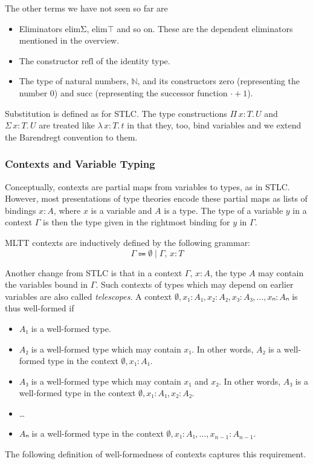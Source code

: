 \documentclass{scrartcl}
\theoremstyle{definition}
\newcommand{\Lam}[2]{λ\,#1.\, #2}
\newcommand{\PiT}[2]{Π\,#1.\, #2}
\newcommand{\SigT}[2]{Σ\,#1.\, #2}
\newcommand{\zero}{\mathrm{zero}}
\newcommand{\suc}{\mathrm{succ}}
\newcommand{\elimSig}{\mathrm{elimΣ}}
\newcommand{\elimTop}{\mathrm{elim⊤}}
\newcommand{\refl}{\mathrm{refl}}
\begin{document}
The other terms we have not seen so far are
\begin{itemize}
  \item Eliminators $\elimSig$, $\elimTop$ and so on.
        These are the dependent eliminators mentioned in the overview.
  \item The constructor $\refl$ of the identity type.
  \item The type of natural numbers, $ℕ$, and its constructors $\zero$ (representing the number 0) and $\suc$ (representing the successor function $· + 1$).
\end{itemize}

Substitution is defined as for STLC.\@
The type constructions $\PiT{x : T}{U}$ and $\SigT{x : T}{U}$ are treated like $\Lam{x : T}{t}$ in that they, too, bind variables and we extend the Barendregt convention to them.

\subsubsection{Contexts and Variable Typing}

Conceptually, contexts are partial maps from variables to types, as in STLC.\@
However, most presentations of type theories encode these partial maps as lists of bindings $x : A$, where $x$ is a variable and $A$ is a type.
The type of a variable $y$ in a context $Γ$ is then the type given in the rightmost binding for $y$ in $Γ$.

\begin{definition}[Contexts]
  MLTT contexts are inductively defined by the following grammar:
  \[
    Γ \Coloneqq ∅ \mid Γ,\, x : T
  \]
\end{definition}

Another change from STLC is that in a context $Γ,\, x : A$, the type $A$ may contain the variables bound in $Γ$.
Such contexts of types which may depend on earlier variables are also called \emph{telescopes}.
A context $∅, x₁ : A₁, x₂ : A₂, x₃ : A₃, \dots, xₙ : Aₙ$ is thus well-formed if
\begin{itemize}
  \item $A₁$ is a well-formed type.
  \item $A₂$ is a well-formed type which may contain $x₁$.
        In other words, $A₂$ is a well-formed type in the context $∅, x₁ : A₁$.
  \item $A₃$ is a well-formed type which may contain $x₁$ and $x₂$.
        In other words, $A₃$ is a well-formed type in the context $∅, x₁ : A₁, x₂ : A₂$.
  \item \dots
  \item $Aₙ$ is a well-formed type in the context $∅, x₁ : A₁, \dots, x_{n-1} : A_{n-1}$.
\end{itemize}
The following definition of well-formedness of contexts captures this requirement.
\end{document}
